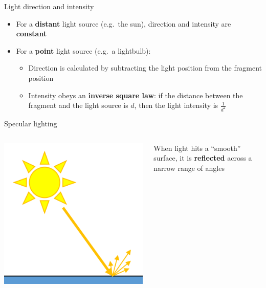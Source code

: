 \begin{frame}{Light direction and intensity}
	\begin{itemize}
		\pause\item For a \textbf{distant} light source (e.g.\ the sun),
			direction and intensity are \textbf{constant}
		\pause\item For a \textbf{point} light source (e.g.\ a lightbulb):
			\begin{itemize}
				\pause\item Direction is calculated by subtracting the light position from the fragment position
				\pause\item Intensity obeys an \textbf{inverse square law}: if the distance between the fragment and the light source is $d$,
					then the light intensity is $\frac{1}{d^2}$
			\end{itemize}
	\end{itemize}
\end{frame}

\begin{frame}{Specular lighting}
	\pause
	\begin{columns}
		\begin{column}{0.33\textwidth}
			\includegraphics[width=\textwidth]{specular_1}
		\end{column}
		\begin{column}{0.65\textwidth}
			When light hits a ``smooth'' surface, it is \textbf{reflected} across a narrow range of angles
		\end{column}
	\end{columns}
\end{frame}

